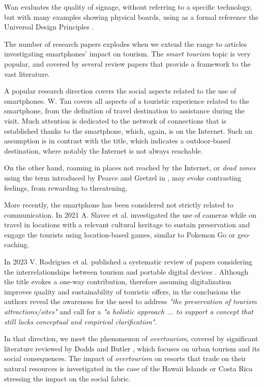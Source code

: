 \documentclass[sustainability,article,submit,pdftex,moreauthors]{Definitions/mdpi}
\begin{document}
Wan \cite{wan22a} evaluates the quality of signage, without referring to a specific technology, but with many examples showing physical boards, using as a formal reference the Universal Design Principles \cite{udi97a}.


The number of research papers explodes when we extend the range to articles investigating smartphones' impact on tourism. The {\em smart tourism} topic is very popular, and covered by several review papers that provide a framework to the vast literature.

A popular research direction covers the social aspects related to the use of smartphones. W. Tan \cite{tan17a} covers all aspects of a touristic experience related to the smartphone, from the definition of travel destination to assistance during the visit. Much attention is dedicated to the network of connections that is established thanks to the smartphone, which, again, is on the Internet. Such an assumption is in contrast with the title, which indicates a outdoor-based destination, where notably the Internet is not always reachable.

On the other hand, roaming in places not reached by the Internet, or {\em dead zones} using the term introduced by Pearce and Gretzel in \cite{pea12a}, may evoke contrasting feelings, from rewarding to threatening.

More recently, the smartphone has been considered not strictly related to communication. In 2021 A. Slavec et al. investigated the use of cameras \cite{sla21a} while on travel in locations with a relevant cultural heritage to sustain preservation and engage the tourists using location-based games, similar to Pokemon Go or geo-caching.

In 2023 V. Rodrigues et al. published a systematic review of papers considering the interrelationships between tourism and portable digital devices \cite{rod23a}. Although the title evokes a one-way contribution, therefore assuming digitalization improves quality and sustainability of touristic offers, in the conclusions the authors reveal the awareness for the need to address {\em "the preservation of tourism attractions/sites"} and call for a {\em "a holistic approach ... to support a concept that still lacks conceptual and empirical clarification"}.

In that direction, we meet the phenomenon of {\em overtourism}, covered by significant literature reviewed by Dodds and Butler \cite{dod19a}, which focuses on urban tourism and its social consequences. The impact of {\em overtourism} on resorts that trade on their natural resources is investigated in the case of the Hawaii Islands \cite{lin22a} or Costa Rica \cite{mat10a} stressing the impact on the social fabric.
\end{document}
